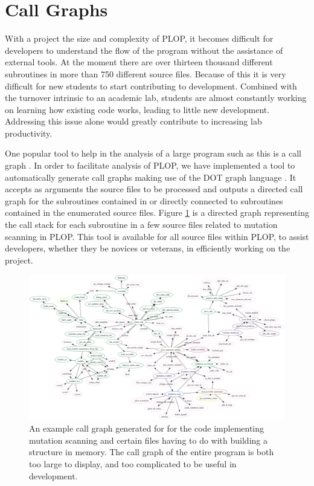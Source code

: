 \section{Call Graphs}
\label{section:unsorted/call_graphs}

With a project the size and complexity of PLOP, it becomes difficult for developers to understand the flow of the program without the assistance of external tools.
At the moment there are over thirteen thousand different subroutines in more than 750 different source files.
Because of this it is very difficult for new students to start contributing to development.
Combined with the turnover intrinsic to an academic lab, students are almost constantly working on learning how existing code works, leading to little new development.
Addressing this issue alone would greatly contribute to increasing lab productivity.

One popular tool to help in the analysis of a large program such as this is a call graph \cite{graham1982gprof}.
In order to facilitate analysis of PLOP, we have implemented a tool to automatically generate call graphs making use of the DOT graph language \cite{koutsofios1991drawing}.
It accepts as arguments the source files to be processed and outputs a directed call graph for the subroutines contained in or directly connected to subroutines contained in the enumerated source files.
Figure \ref{figure:mutation_call_graph} is a directed graph representing the call stack for each subroutine in a few source files related to mutation scanning in PLOP.
This tool is available for all source files within PLOP, to assist developers, whether they be novices or veterans, in efficiently working on the project.

\begin{landscape}
\begin{figure}[h]
    \centering
    \includegraphics[width=1.2\textheight,height=1.2\textheight,keepaspectratio]{figures/plop_connected_sfdp.png}
    \caption{An example call graph generated for for the code implementing mutation scanning and certain files having to do with building a structure in memory.
The call graph of the entire program is both too large to display, and too complicated to be useful in development.}
    \label{figure:mutation_call_graph}
\end{figure}
\end{landscape}
